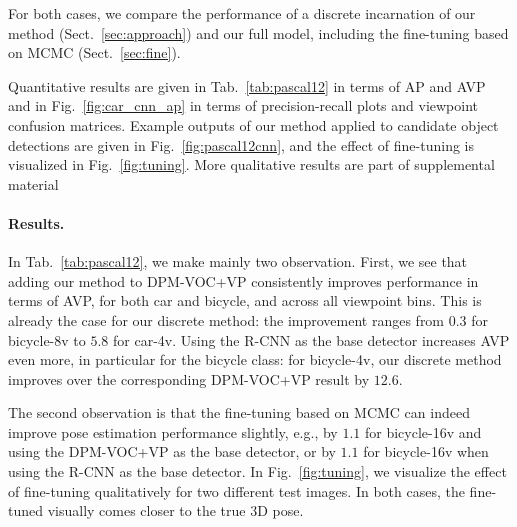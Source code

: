 For both cases, we compare the performance of a discrete incarnation
of our method (Sect.~\ref{sec:approach}) and our full model, including the
fine-tuning based on MCMC (Sect.~\ref{sec:fine}).

Quantitative results are given in Tab.~\ref{tab:pascal12} in terms of
AP and AVP and in Fig.~\ref{fig:car_cnn_ap} in terms of
precision-recall plots and viewpoint confusion matrices. Example
outputs of our method applied to candidate object detections are given
in Fig.~\ref{fig:pascal12cnn}, and the effect of fine-tuning is
visualized in Fig.~\ref{fig:tuning}. More qualitative results are part of
supplemental material
\paragraph{Results.}
%
In Tab.~\ref{tab:pascal12}, we make mainly two observation. First, we
see that adding our method to DPM-VOC+VP consistently improves
performance in terms of AVP, for both car and bicycle, and across all
viewpoint bins. This is already the case for our discrete method: the
improvement ranges from $0.3$ for bicycle-8v to $5.8$ for car-4v. 
%
Using the R-CNN as the base detector increases AVP even more, in
particular for the bicycle class: for bicycle-4v, our discrete method
improves over the corresponding DPM-VOC+VP result by $12.6$.

The second observation is that the fine-tuning based on MCMC can
indeed improve pose estimation performance slightly, e.g., by $1.1$
for bicycle-16v and using the DPM-VOC+VP as the base detector, or by
$1.1$ for bicycle-16v when using the R-CNN as the base detector.
%
In Fig.~\ref{fig:tuning}, we visualize the effect of fine-tuning
qualitatively for two different test images. In both cases, the
fine-tuned visually comes closer to the true 3D pose.


